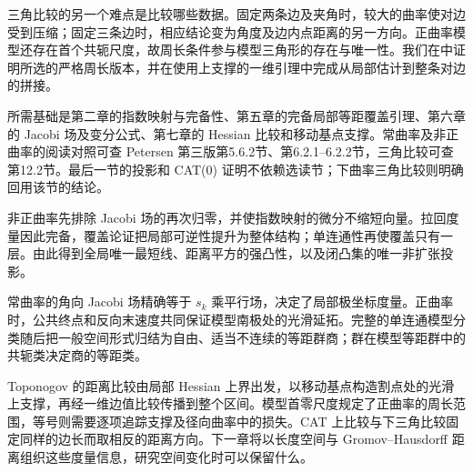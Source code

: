 \ProseParagraphBreak

三角比较的另一个难点是比较哪些数据。固定两条边及夹角时，较大的曲率使对边受到压缩；固定三条边时，相应结论变为角度及边内点距离的另一方向。正曲率模型还存在首个共轭尺度，故周长条件参与模型三角形的存在与唯一性。我们在中证明所选的严格周长版本，并在使用上支撑的一维引理中完成从局部估计到整条对边的拼接。

\ProseParagraphBreak

所需基础是第二章的指数映射与完备性、第五章的完备局部等距覆盖引理、第六章的 Jacobi 场及变分公式、第七章的 Hessian 比较和移动基点支撑。常曲率及非正曲率的阅读对照可查 Petersen 第三版第5.6.2节、第6.2.1--6.2.2节，三角比较可查第12.2节\cite[第5.6.2节，第6.2.1--6.2.2节，第12.2节]{Petersen2016}。最后一节的投影和 CAT(0) 证明不依赖选读节；下曲率三角比较则明确回用该节的结论。






\begin{chaptersummary}
	非正曲率先排除 Jacobi 场的再次归零，并使指数映射的微分不缩短向量。拉回度量因此完备，覆盖论证把局部可逆性提升为整体结构；单连通性再使覆盖只有一层。由此得到全局唯一最短线、距离平方的强凸性，以及闭凸集的唯一非扩张投影。

	\ProseParagraphBreak

	常曲率的角向 Jacobi 场精确等于 \(s_k\) 乘平行场，决定了局部极坐标度量。正曲率时，公共终点和反向末速度共同保证模型南极处的光滑延拓。完整的单连通模型分类随后把一般空间形式归结为自由、适当不连续的等距群商；群在模型等距群中的共轭类决定商的等距类。

	\ProseParagraphBreak

	Toponogov 的距离比较由局部 Hessian 上界出发，以移动基点构造割点处的光滑上支撑，再经一维边值比较传播到整个区间。模型首零尺度规定了正曲率的周长范围，等号则需要逐项追踪支撑及径向曲率中的损失。CAT 上比较与下三角比较固定同样的边长而取相反的距离方向。下一章将以长度空间与 Gromov--Hausdorff 距离组织这些度量信息，研究空间变化时可以保留什么。
\end{chaptersummary}

\BookExercises

